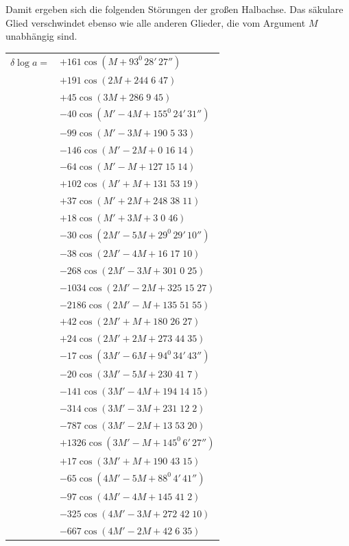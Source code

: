 \begin{landscape}
\begin{center}
\begin{tabular}{@{}l@{\quad}l@{}}
\end{tabular}
\end{center}
\endgroup
\par\noindent\hspace*{\parindent}Damit ergeben sich die folgenden Störungen der großen Halbachse. Das säkulare Glied verschwindet ebenso wie alle anderen Glieder, die vom Argument \(M\) unabhängig sind.
\begingroup
\renewcommand{\arraystretch}{1.15}
\begin{longtable}{@{}r@{}l@{}}
\(\delta\log a={}\)&\(+161\cos(M+93^0\,28'\,27'')\)\\
&\(+191\cos(2M+244\;6\;47)\)\\
&\(+45\cos(3M+286\;9\;45)\)\\[3pt]
&\(-40\cos(M'-4M+155^0\,24'\,31'')\)\\
&\(-99\cos(M'-3M+190\;5\;33)\)\\
&\(-146\cos(M'-2M+0\;16\;14)\)\\
&\(-64\cos(M'-M+127\;15\;14)\)\\
&\(+102\cos(M'+M+131\;53\;19)\)\\
&\(+37\cos(M'+2M+248\;38\;11)\)\\
&\(+18\cos(M'+3M+3\;0\;46)\)\\[3pt]
&\(-30\cos(2M'-5M+29^0\,29'\,10'')\)\\
&\(-38\cos(2M'-4M+16\;17\;10)\)\\
&\(-268\cos(2M'-3M+301\;0\;25)\)\\
&\(-1034\cos(2M'-2M+325\;15\;27)\)\\
&\(-2186\cos(2M'-M+135\;51\;55)\)\\
&\(+42\cos(2M'+M+180\;26\;27)\)\\
&\(+24\cos(2M'+2M+273\;44\;35)\)\\[3pt]
&\(-17\cos(3M'-6M+94^0\,34'\,43'')\)\\
&\(-20\cos(3M'-5M+230\;41\;7)\)\\
&\(-141\cos(3M'-4M+194\;14\;15)\)\\
&\(-314\cos(3M'-3M+231\;12\;2)\)\\
&\(-787\cos(3M'-2M+13\;53\;20)\)\\
&\(+1326\cos(3M'-M+145^0\,6'\,27'')\)\\
&\(+17\cos(3M'+M+190\;43\;15)\)\\[3pt]
&\(-65\cos(4M'-5M+88^0\,4'\,41'')\)\\
&\(-97\cos(4M'-4M+145\;41\;2)\)\\
&\(-325\cos(4M'-3M+272\;42\;10)\)\\
&\(-667\cos(4M'-2M+42\;6\;35)\)\\

\end{longtable}
\end{landscape}
